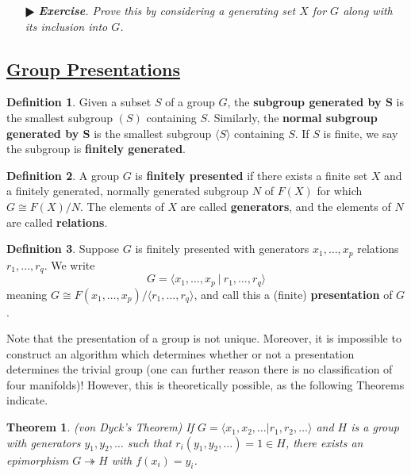 \documentclass[11pt]{amsart}
\newtheorem*{theorem*}{Theorem}
\theoremstyle{definition}
\newtheorem*{definition*}{Definition}
\renewcommand\:{\colon}
\newcommand{\1}{\mathds{1}}
\newcommand{\exc}[1]{\vspace{-2.5pt}\begin{itemize}[leftmargin=15pt]\item[$\RHD$] \textit{\textbf{Exercise}. #1}\end{itemize}}
\begin{document}
\exc{Prove this by considering a generating set $X$ for $G$ along with its inclusion into $G$.}

\vskip20pt



\subsection*{\underline{Group Presentations}}

\begin{definition*}
	Given a subset $S$ of a group $G$, the \textbf{subgroup generated by $\boldsymbol{S}$} is the smallest subgroup $(S)$ containing $S$. Similarly, the \textbf{normal subgroup generated by $\boldsymbol{S}$} is the smallest subgroup $\langle S \rangle$ containing $S$. If $S$ is finite, we say the subgroup is \textbf{finitely generated}.
\end{definition*}

\begin{definition*}
	A group $G$  is \textbf{finitely presented} if there exists a finite set $X$ and a finitely generated, normally generated subgroup $N$ of $F(X)$ for which $G \cong F(X)/N$. The elements of $X$ are called \textbf{generators}, and the elements of $N$ are called \textbf{relations}. 
\end{definition*}

\begin{definition*}
	Suppose $G$ is finitely presented with generators $x_1, \dots, x_p$ relations $r_1, \dots, r_q$. We write
		\[ G = \langle x_1, \dots, x_p \ | \ r_1, \dots, r_q \rangle \]
	 meaning $G \cong F( x_1, \dots, x_p ) / \langle r_1, \dots, r_q \rangle$, and call this a (finite) \textbf{presentation} of $G$.
\end{definition*}

Note that the presentation of a group is not unique. Moreover, it is impossible to construct an algorithm which determines whether or not a presentation determines the trivial group (one can further reason there is no classification of four manifolds)! However, this is theoretically possible, as the following Theorems indicate.

\begin{theorem*}
	\textnormal{(von Dyck's Theorem)} If $G = \langle x_1, x_2, \dots | r_1, r_2, \dots \rangle$ and $H$ is a group with generators $y_1, y_2, \dots$ such that $r_i(y_1, y_2, \dots) = 1 \in H$, there exists an epimorphism $G \twoheadrightarrow H$ with $f(x_i) = y_i$. 
\end{theorem*}
\end{document}
